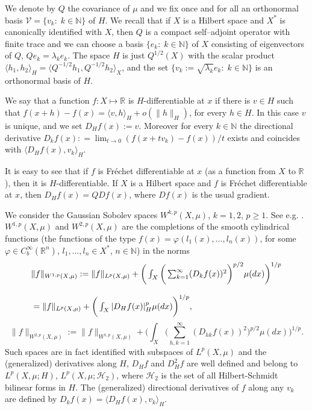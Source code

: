 \documentclass[reqno,twoside,12pt]{amsart}
\begin{document}
We denote by $Q$ the covariance of $\mu$ and we fix once and for all an orthonormal basis ${\mathcal V} =\{v_k:\;k\in {\mathbb N}\}$ of $H$.  We recall that if $X$ is a Hilbert space and $X^*$ is canonically identified with $X$, then $Q$ is a compact self--adjoint operator with finite trace and we can choose a basis $\{e_k:\;k\in {\mathbb N}\}$ of $X$  consisting of  eigenvectors of $Q$, $Qe_k= \lambda_ke_k$.  The space $H$ is just $Q^{1/2}(X)$ with the scalar product $\langle h_1, h_2\rangle_H= \langle Q^{-1/2}h_1,  Q^{-1/2}h_2\rangle_X$, and the set $\{v_k:= \sqrt{\lambda_k}e_k:\;k\in {\mathbb N}\}$ is an  orthonormal basis of $H$. 
  
 
We say that a function $f:X\mapsto {\mathbb R}$ is $H$-differentiable at $x$ if there is $v\in H$ such that $f(x+h)-f(x) = \langle v, h\rangle_H + o(\|h\|_H)$, for every $h\in H$. In this case $v$ is unique, and we set $D_Hf(x) := v$. Moreover for every $k\in {\mathbb N}$ the directional derivative
$D_kf(x) : = \lim_{t\to 0}(f(x+tv_k) - f(x))/t$  exists and coincides with $\langle D_Hf(x), v_k\rangle_H$. 

It is easy to see that if $f $ is Fr\'echet differentiable at $x$ (as a function from $X$ to ${\mathbb R}$), then it is $H$-differentiable. 
If $X$ is a Hilbert space and $f $ is Fr\'echet differentiable at $x$, then 
$D_H f(x) = QDf(x)$, where $Df(x)$ is the usual gradient. 
 
We consider the Gaussian Sobolev spaces $W^{k,p}(X, \mu)$, $k=1, 2$, $p\geq 1$. See e.g.  \cite[Sect. 5.2]{Boga}.  $W^{1,p}(X, \mu)$ and $W^{2,p}(X, \mu)$ are the completions of the smooth cylindrical functions (the functions of the type $f(x) = \varphi(l_1(x), \ldots, l_n(x))$, for some $ \varphi\in C^{\infty}_b({\mathbb R}^n)$, $l_1, \ldots, l_n\in X^*$, $n\in {\mathbb N}$) in the norms 
$$\begin{array}{l}
{\displaystyle} \|f\|_{W^{1,p}(X, \mu)} := \|f\|_{L^p(X, \mu)} + \bigg( \int_X \bigg(\sum_{k=1}^{\infty}  (D_{k}f(x))^2\bigg)^{p/2}\mu(dx)\bigg)^{1/p} 
\\
\\
{\displaystyle} =  \|f\|_{L^p(X, \mu)} + \bigg( \int_X |D_Hf(x)|_H^{p}\mu(dx)\bigg)^{1/p}, \end{array}$$
$$\|f\|_{W^{2,p}(X, \mu)} := \|f\|_{W^{1,p}(X, \mu)} + \bigg( \int_X \bigg(\sum_{h, k=1}^{\infty}   (D_{hk}f(x))^2\bigg)^{p/2}\mu(dx)\bigg)^{1/p}. $$
Such spaces are in fact identified with subspaces of $L^p(X, \mu)$ and the (generalized) derivatives along $H$, $D_Hf$ and $D^2_Hf$ are well defined and belong to 
$L^p(X, \mu; H)$, $L^p(X, \mu;  {\mathcal H}_2)$, where ${\mathcal H}_2$ is the set of all Hilbert-Schmidt bilinear forms in $H$. The (generalized) directional derivatives of $f$ along any $v_k$ are defined by $D_kf(x) = \langle D_Hf(x), v_k\rangle_H$. 
\end{document}
